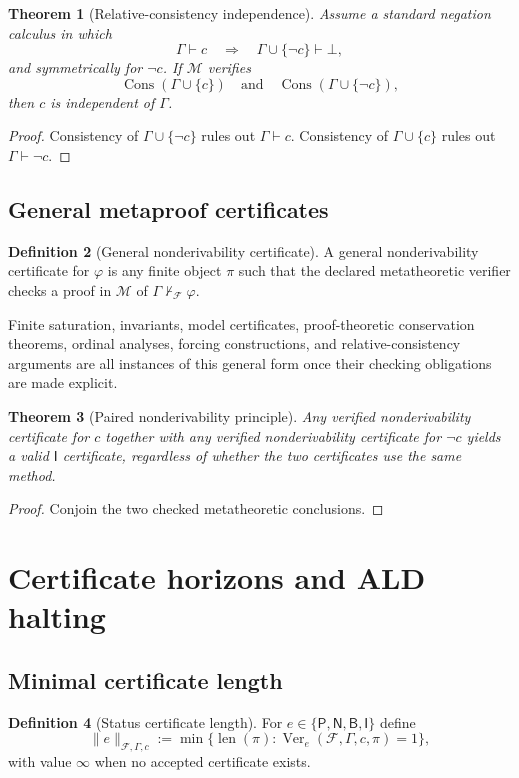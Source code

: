 \documentclass[11pt]{article}
\newtheorem{theorem}{Theorem}[section]
\theoremstyle{definition}
\newtheorem{definition}[theorem]{Definition}
\theoremstyle{remark}
\newcommand{\Ver}{\operatorname{Ver}}
\newcommand{\Len}{\operatorname{len}}
\newcommand{\Cons}{\operatorname{Cons}}
\newcommand{\Plus}{\mathsf{P}}
\newcommand{\Minus}{\mathsf{N}}
\newcommand{\BotEv}{\mathsf{B}}
\newcommand{\IndEv}{\mathsf{I}}
\newcommand{\M}{\mathcal M}
\newcommand{\F}{\mathcal F}
\newcommand{\Gammaa}{\Gamma}
\newcommand{\bottomf}{\bot}
\begin{document}
\begin{theorem}[Relative-consistency independence]
Assume a standard negation calculus in which
\[
\Gammaa\vdash c\quad\Longrightarrow\quad\Gammaa\cup\{\neg c\}\vdash\bottomf,
\]
and symmetrically for $\neg c$. If $\M$ verifies
\[
\Cons(\Gammaa\cup\{c\})
\quad\text{and}\quad
\Cons(\Gammaa\cup\{\neg c\}),
\]
then $c$ is independent of $\Gammaa$.
\end{theorem}

\begin{proof}
Consistency of $\Gammaa\cup\{\neg c\}$ rules out $\Gammaa\vdash c$. Consistency of $\Gammaa\cup\{c\}$ rules out $\Gammaa\vdash\neg c$.
\end{proof}

\subsection{General metaproof certificates}
\begin{definition}[General nonderivability certificate]
A general nonderivability certificate for $\varphi$ is any finite object $\pi$ such that the declared metatheoretic verifier checks a proof in $\M$ of $\Gammaa\nvdash_{\F}\varphi$.
\end{definition}

Finite saturation, invariants, model certificates, proof-theoretic conservation theorems, ordinal analyses, forcing constructions, and relative-consistency arguments are all instances of this general form once their checking obligations are made explicit.

\begin{theorem}[Paired nonderivability principle]
Any verified nonderivability certificate for $c$ together with any verified nonderivability certificate for $\neg c$ yields a valid $\IndEv$ certificate, regardless of whether the two certificates use the same method.
\end{theorem}

\begin{proof}
Conjoin the two checked metatheoretic conclusions.
\end{proof}

\section{Certificate horizons and ALD halting}

\subsection{Minimal certificate length}
\begin{definition}[Status certificate length]
For $e\in\{\Plus,\Minus,\BotEv,\IndEv\}$ define
\[
\|e\|_{\F,\Gammaa,c}
:=\min\{\Len(\pi):\Ver_e(\F,\Gammaa,c,\pi)=1\},
\]
with value $\infty$ when no accepted certificate exists.
\end{definition}
\end{document}
